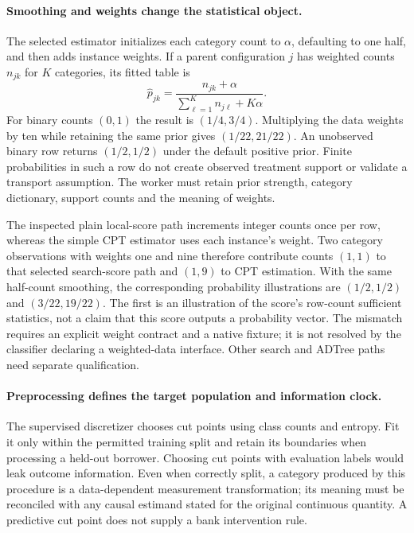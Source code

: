 \paragraph{Smoothing and weights change the statistical object.}
The selected estimator initializes each category count to $\alpha$, defaulting
to one half, and then adds instance weights. If a parent configuration $j$
has weighted counts $n_{jk}$ for $K$ categories, its fitted table is
\[
 \widehat p_{jk}=\frac{n_{jk}+\alpha}
 {\sum_{\ell=1}^{K}n_{j\ell}+K\alpha}.
\]
For binary counts $(0,1)$ the result is $(1/4,3/4)$. Multiplying the data
weights by ten while retaining the same prior gives $(1/22,21/22)$.
An unobserved binary row returns $(1/2,1/2)$ under the default positive prior.
Finite probabilities in such a row do not create observed treatment support
or validate a transport assumption. The worker must retain prior strength,
category dictionary, support counts and the meaning of weights.
\citep{exec24_weka_source,exec24_weka_choice}

The inspected plain local-score path increments integer counts once per row,
whereas the simple CPT estimator uses each instance's weight. Two category
observations with weights one and nine therefore contribute counts $(1,1)$
to that selected search-score path and $(1,9)$ to CPT estimation. With the
same half-count smoothing, the corresponding probability illustrations are
$(1/2,1/2)$ and $(3/22,19/22)$. The first is an illustration of the score's
row-count sufficient statistics, not a claim that this score outputs a
probability vector. The mismatch requires an explicit weight contract and a
native fixture; it is not resolved by the classifier declaring a weighted-data
interface. Other search and ADTree paths need separate qualification.
\citep{exec24_weka_source,exec24_weka_choice}

\paragraph{Preprocessing defines the target population and information clock.}
The supervised discretizer chooses cut points using class counts and entropy.
Fit it only within the permitted training split and retain its boundaries when
processing a held-out borrower. Choosing cut points with evaluation labels
would leak outcome information. Even when correctly split, a category produced
by this procedure is a data-dependent measurement transformation; its meaning
must be reconciled with any causal estimand stated for the original continuous
quantity. A predictive cut point does not supply a bank intervention rule.
\citep{exec24_weka_source}

